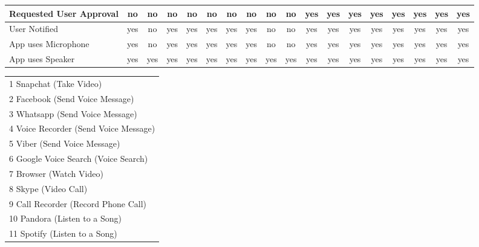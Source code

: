 \begin{table*}
\begin{tabular} {l|c|c|c|c|c|c|c|c|c|c|c|c|c|c|c|c|c|}
\hline

\multicolumn{1}{|l|}{  \cellcolor[gray]{0.6}Requested User Approval}& \cellcolor[gray]{0.8}no & \cellcolor[gray]{0.8}no & \cellcolor[gray]{0.8}no  & \cellcolor[gray]{0.8}no & \cellcolor[gray]{0.8}no & \cellcolor[gray]{0.8}no & \cellcolor[gray]{0.8}no & \cellcolor[gray]{0.8}no & \cellcolor[gray]{0.8}no & yes  & yes  & yes &  yes & yes &  yes & yes & yes \\ \hline 

\multicolumn{1}{|l|}{  \cellcolor[gray]{0.6}User Notified}& yes & \cellcolor[gray]{0.8}no & yes  & yes & yes & yes & yes & \cellcolor[gray]{0.8}no & \cellcolor[gray]{0.8}no & yes  & yes  & yes &  yes & yes &  yes & yes & yes \\ \hline

\multicolumn{1}{|l|}{  \cellcolor[gray]{0.6}App uses Microphone}& yes & \cellcolor[gray]{0.8}no & yes  & yes & yes & yes & yes & \cellcolor[gray]{0.8}no & \cellcolor[gray]{0.8}no & yes  & yes  & yes &  yes & yes &  yes & yes & yes \\ \hline
 
\multicolumn{1}{|l|}{  \cellcolor[gray]{0.6}App uses Speaker}& yes & yes & yes  & yes & yes & yes & yes & yes & yes & yes  & yes  & yes &  yes & yes &  yes & yes & yes \\ \hline

\end{tabular}
\quad
\begin{tabular}{l}
\tiny 1  Snapchat (Take Video)\\
\tiny 2  Facebook (Send Voice Message)\\
\tiny 3  Whatsapp (Send Voice Message)\\
\tiny 4  Voice Recorder (Send Voice Message)\\
\tiny 5  Viber (Send Voice Message) \\
\tiny 6  Google Voice Search (Voice Search)\\
\tiny 7  Browser (Watch Video)\\
\tiny 8  Skype (Video Call)\\
\tiny 9  Call Recorder (Record Phone Call)\\
\tiny 10 Pandora (Listen to a Song)\\
\tiny 11 Spotify (Listen to a Song)\\
\end{tabular}

\vspace*{-\baselineskip}
\end{table*}


